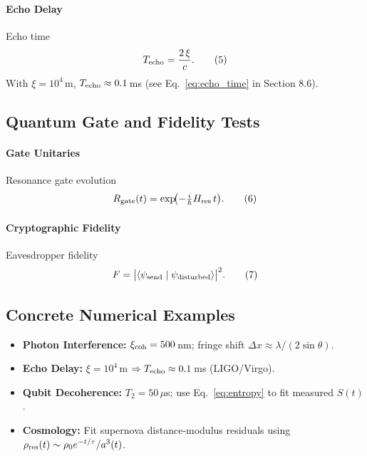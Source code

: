 \paragraph{Echo Delay}  
Echo time
\begin{equation}\label{eq:echo_time}
T_{\rm echo} = \frac{2\,\xi}{c}.
\tag{5}
\end{equation}
With $\xi=10^4\,$m, $T_{\rm echo}\approx0.1\,$ms (see Eq.~\eqref{eq:echo_time} in Section 8.6).

\subsection{Quantum Gate and Fidelity Tests}

\paragraph{Gate Unitaries}  
Resonance gate evolution
\begin{equation}\label{eq:gate}
R_{\rm gate}(t) = \exp\!\bigl(-\tfrac{i}{\hbar}H_{\rm res}\,t\bigr).
\tag{6}
\end{equation}

\paragraph{Cryptographic Fidelity}  
Eavesdropper fidelity
\begin{equation}\label{eq:fidelity}
F = \bigl|\langle \psi_{\rm send} \mid \psi_{\rm disturbed}\rangle\bigr|^2.
\tag{7}
\end{equation}

\subsection{Concrete Numerical Examples}

\begin{itemize}
  \item \textbf{Photon Interference:} $\xi_{\rm coh}=500\,$nm; fringe shift $\Delta x\approx\lambda/(2\sin\theta)$.  
  \item \textbf{Echo Delay:} $\xi=10^4\,$m $\Rightarrow T_{\rm echo}\approx0.1\,$ms (LIGO/Virgo).  
  \item \textbf{Qubit Decoherence:} $T_2=50\,\mu$s; use Eq.~\eqref{eq:entropy} to fit measured $S(t)$.  
  \item \textbf{Cosmology:} Fit supernova distance‐modulus residuals using $\rho_{\rm res}(t)\sim \rho_0 e^{-t/\tau}/a^3(t)$.
\end{itemize}

